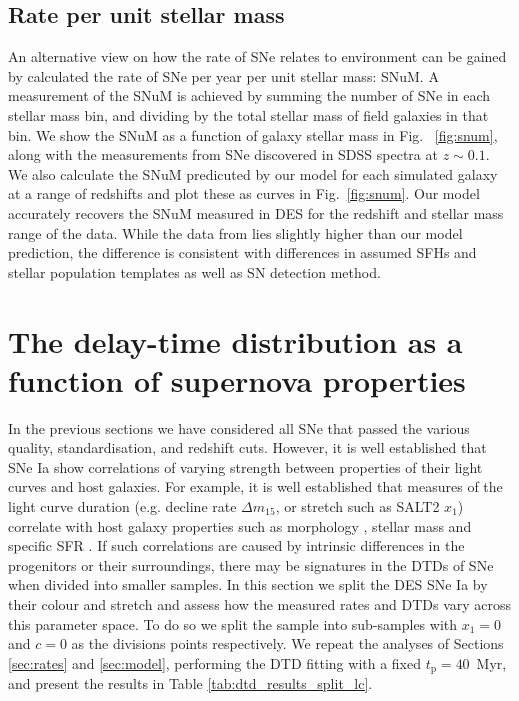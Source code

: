 \documentclass[fleqn,usenatbib]{mnras}
\begin{document}
\subsection{Rate per unit stellar mass \label{subsec:snum}}

An alternative view on how the rate of SNe relates to environment can be gained by calculated the rate of SNe per year per unit stellar mass: SNuM. A measurement of the SNuM is achieved by summing the number of SNe in each stellar mass bin, and dividing by the total stellar mass of field galaxies in that bin. We show the SNuM as a function of galaxy stellar mass in Fig.~ \ref{fig:snum}, along with the measurements from SNe discovered in SDSS spectra \citep{Graur2013} at $z\sim0.1$. We also calculate the SNuM predicuted by our model for each simulated galaxy at a range of redshifts and plot these as curves in Fig.~\ref{fig:snum}. Our model accurately recovers the SNuM measured in DES for the redshift and stellar mass range of the data. While the data from \citet{Graur2013} lies slightly higher than our model prediction, the difference is consistent with differences in assumed SFHs and stellar population templates as well as SN detection method.
\section{The delay-time distribution as a function of supernova properties}
\label{sec:split_x1_c}

In the previous sections we have considered all SNe that passed the various quality, standardisation, and redshift cuts. However, it is well established that SNe Ia show correlations of varying strength between properties of their light curves and host galaxies. For example, it is well established that measures of the light curve duration (e.g. decline rate $\Delta m_{15}$, or stretch such as SALT2 $x_1$) correlate with host galaxy properties such as morphology \citep{Hamuy1995,Hamuy2000,Mannucci2005}, stellar mass \citep{Kelly2010,Lampeitl2010,Sullivan2010} and specific SFR \citep{Rigault2013,Rigault2018}. If such correlations are caused by intrinsic differences in the progenitors or their surroundings, there may be signatures in the DTDs of SNe when divided into smaller samples. In this section we split the DES SNe Ia by their colour and stretch and assess how the measured rates and DTDs vary across this parameter space. To do so we split the sample into sub-samples with $x_1 = 0$ and $c=0$ as the divisions points respectively. We repeat the analyses of Sections \ref{sec:rates} and \ref{sec:model}, performing the DTD fitting with a fixed $t_{\mathrm{p}} = 40$~Myr, and present the results in Table \ref{tab:dtd_results_split_lc}.
\end{document}
